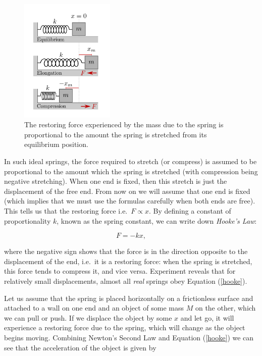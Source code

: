 \begin{figure}[!htb]
    \centering
    \includegraphics[width=0.4\textwidth]{figs/springForce.png}
    \caption{The restoring force experienced by the mass due to the spring is proportional to the amount the spring is stretched from its equilibrium position.}
    \label{fig:springForces}
\end{figure}

In such ideal springs, the force required to stretch (or compress) is assumed to be proportional to the amount which the spring is stretched (with compression being negative stretching). When one end is fixed, then this stretch is just the displacement of the free end. From now on we will assume that one end is fixed (which implies that we must use the formulas carefully when both ends are free). This tells us that the restoring force i.e.\ $F \propto x$. By defining a constant of proportionality $k$, known as the spring constant, we can write down \textit{Hooke's Law}:

\begin{equation}
    F = - k x,
    \label{hooke}
\end{equation}

where the negative sign shows that the force is in the direction opposite to the displacement of the end, i.e.\ it is a restoring force: when the spring is stretched, this force tends to compress it, and vice versa. Experiment reveals that for relatively small displacements, almost all \textit{real} springs obey Equation (\ref{hooke}).

Let us assume that the spring is placed horizontally on a frictionless surface and attached to a wall on one end and an object of some mass $M$ on the other, which we can pull or push. If we displace the object by some $x$ and let go, it will experience a restoring force due to the spring, which will change as the object begins moving. Combining Newton's Second Law and Equation (\ref{hooke}) we can see that the acceleration of the object is given by

